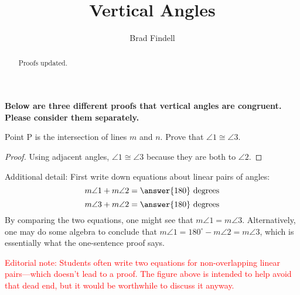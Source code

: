 \documentclass[nooutcomes]{ximera}
\title{Vertical Angles}
\author{Brad Findell}
\begin{document}
\begin{abstract}
Proofs updated. 
\end{abstract}
\maketitle

\textbf{Below are three different proofs that vertical angles are congruent.  Please consider them separately.}

\begin{problem}
Point P is the intersection of lines $m$ and $n$.  Prove that $\angle 1\cong \angle 3$.  

\begin{image}
\end{image}

\begin{proof}
Using adjacent angles, $\angle 1\cong \angle 3$ because they are both  to $\angle 2$.
\end{proof}

\begin{problem}
Additional detail: First write down equations about linear pairs of angles: 
\[
m\angle 1 + m\angle 2 = \answer{180} \textrm{ degrees}
\]
\[
m\angle 3 + m\angle 2 = \answer{180} \textrm{ degrees}
\]
By comparing the two equations, one might see that $m\angle 1=m\angle 3$.   
Alternatively, one may do some algebra to conclude that $m\angle 1 = 180^\circ - m\angle 2 = m\angle 3$, which is essentially what the one-sentence proof says.

{\textcolor{red}{Editorial note: Students often write two equations for non-overlapping linear pairs---which doesn't lead to a proof.  The figure above is intended to help avoid that dead end, but it would be worthwhile to discuss it anyway.}}

\end{problem}

\end{problem}
\end{document}
